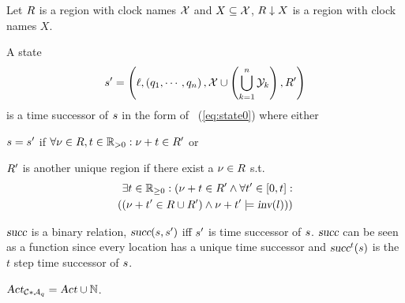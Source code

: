 \begin{lemma}
Let $R$ is a region with clock names $\mathcal{X}$ and $X \subseteq \mathcal{X}$,
$
    {R} \downarrow {X}
$
is a region with clock names $X$.
\end{lemma}
\begin{definition}
A state
\begin{align*}
    s'
    =
    \left (
        \ell
        ,
        \left (
            q_1,
            \cdots,
            q_n
        \right )
        ,
        \mathcal{X} \cup \left( \bigcup_{k=1}^{n} \mathcal{Y}_k \right )
        ,
        R'
    \right )
\end{align*}
is a time successor of $s$ in the form of ~(\ref{eq:state0}) where either 
\begin{compactitem}
    \item 
        $s = s'$ if 
        $
            \forall \nu \in R, t \in \mathbb{R}_{>0} : \nu + t \in R'
        $ or
    \item 
        $R'$ is another unique region if there exist a $ \nu \in R $ s.t.
        \begin{align*}
            \exists t \in \mathbb{R}_{\ge0} : (
                \nu + t \in R' 
                \land
                \forall t' \in [0,t] : \\ \left (
                    \left (
                        \nu + t' \in R \cup R'
                    \right )
                    \land
                    \nu + t' \models \mbox{\sl inv}(l)
                \right )
            )
        \end{align*}
\end{compactitem}
$ \mbox{\sl succ} $ is a binary relation, 
$
    \mbox{\sl succ} (
        s,
        s'
    )
$ iff $ s' $ 
is time successor of $ s $.
$ \mbox{\sl succ} $  can be seen as a function since every location has a unique time successor
and $ \mbox{\sl succ}^t(s) $ is the $t$ step time successor of $s$. 
\end{definition}

\begin{definition}
$
    \mbox{\sl Act}_{{\mathcal{C}}{\ast}{\mathcal{A}_q}}
    =
    \mbox{\sl Act} \cup \mathbb{N}
$.
\end{definition}

